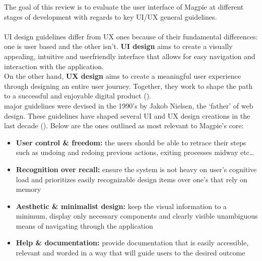 The goal of this review is to evaluate the user interface of Magpie at different stages of development with regards to key UI/UX general guidelines.\\ \\
UI design guidelines differ from UX ones because of their fundamental differences: one is user based and the other isn't. \textbf{UI design} aims to create a visually appealing, intuitive and user\-friendly interface that allows for easy navigation and interaction with the application.\\
On the other hand, \textbf{UX design} aims to create a meaningful user experience through designing an entire user journey. Together, they work to shape the path to a successful and enjoyable digital product (\cite{uiuxguidelines2023}).\\

 major guidelines were devised in the 1990's by Jakob Nielsen, the `father' of web design. These guidelines have shaped several UI and UX design creations in the last decade (\cite{uiuxguidelinesnielsen2016}). Below are the ones outlined as most relevant to Magpie's core:
\begin{itemize}
    \item \textbf{User control \& freedom:} the users should be able to retrace their steps such as undoing and redoing previous actions, exiting processes midway etc\ldots\\
    \item \textbf{Recognition over recall:} ensure the system is not heavy on user's cognitive load and prioritizes easily recognizable design items over one's that rely on memory\\
    \item \textbf{Aesthetic \& minimalist design:} keep the visual information to a minimum, display only necessary components and clearly visible unambiguous means of navigating through the application\\
    \item \textbf{Help \& documentation:} provide documentation that is easily accessible, relevant and worded in a way that will guide users to the desired outcome
\end{itemize}

